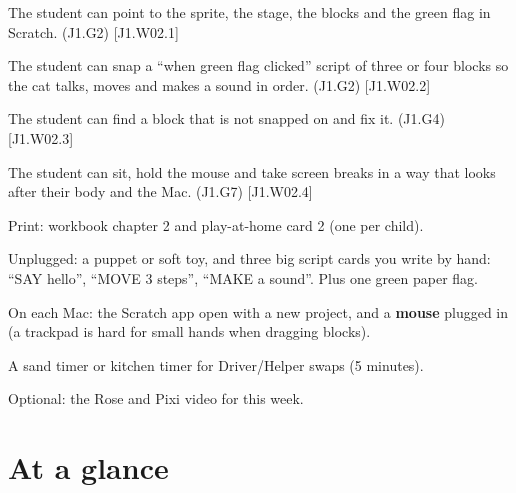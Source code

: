 
\begin{objectives}
  \item The student can point to the sprite, the stage, the blocks and the green flag in Scratch. (J1.G2) [J1.W02.1]
  \item The student can snap a \enquote{when green flag clicked} script of three or four blocks so the cat talks, moves and makes a sound in order. (J1.G2) [J1.W02.2]
  \item The student can find a block that is not snapped on and fix it. (J1.G4) [J1.W02.3]
  \item The student can sit, hold the mouse and take screen breaks in a way that looks after their body and the Mac. (J1.G7) [J1.W02.4]
\end{objectives}

\begin{materials}
  \item Print: workbook chapter 2 and play-at-home card 2 (one per child).
  \item Unplugged: a puppet or soft toy, and three big script cards you write by hand: \enquote{SAY hello}, \enquote{MOVE 3 steps}, \enquote{MAKE a sound}. Plus one green paper flag.
  \item On each Mac: the Scratch app open with a new project, and a \textbf{mouse} plugged in (a trackpad is hard for small hands when dragging blocks).
  \item A sand timer or kitchen timer for Driver/Helper swaps (5 minutes).
  \item Optional: the Rose and Pixi video for this week.
\end{materials}

\section{At a glance}
\begin{timeplan}
\end{timeplan}

